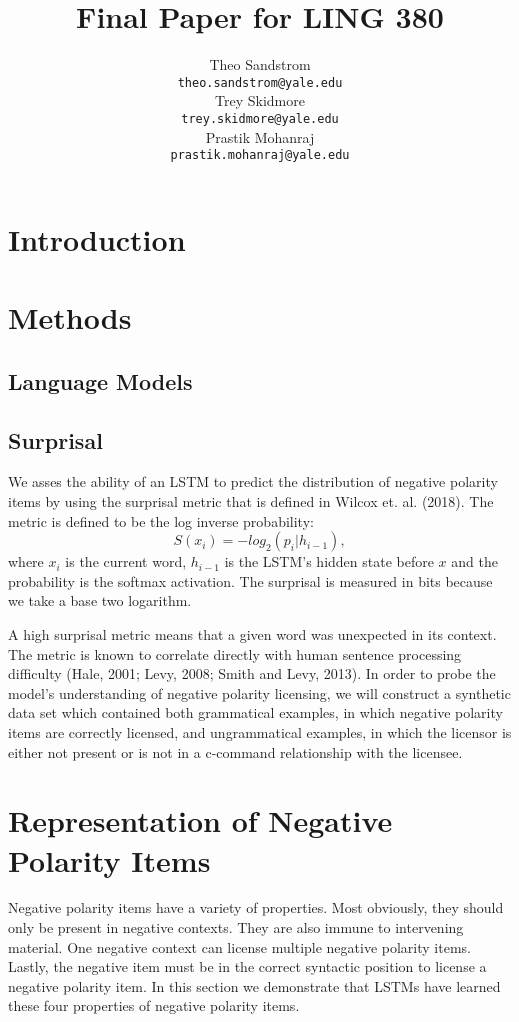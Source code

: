 \documentclass[11pt]{article}
\title{Final Paper for LING 380}
\author{Theo Sandstrom \\
  \texttt{theo.sandstrom@yale.edu} \\
  Trey Skidmore \\
  \texttt{trey.skidmore@yale.edu} \\
  Prastik Mohanraj \\
  \texttt{prastik.mohanraj@yale.edu}}
\begin{document}
\maketitle
\begin{abstract}

\end{abstract}

\section{Introduction}

\section{Methods}
\subsection{Language Models}
\subsection{Surprisal}
We asses the ability of an LSTM to predict the distribution of negative polarity items by using the surprisal metric that is defined in Wilcox et. al. (2018). The metric is defined to be the log inverse probability:
\[S(x_i) = -log_2(p_i|h_{i-1}),\]
where $x_i$ is the current word, $h_{i-1}$ is the LSTM's hidden state before $x$ and the probability is the softmax activation. The surprisal is measured in bits because we take a base two logarithm.

A high surprisal metric means that a given word was unexpected in its context. The metric is known to correlate directly with human sentence processing difficulty (Hale, 2001; Levy, 2008; Smith and Levy, 2013). In order to probe the model’s understanding of negative polarity licensing, we will construct a synthetic data set which contained both grammatical examples, in which negative polarity items are correctly licensed, and ungrammatical examples, in which the licensor is either not present or is not in a c-command relationship with the licensee.


\section{Representation of Negative Polarity Items}
Negative polarity items have a variety of properties. Most obviously, they should only be present in negative contexts. They are also immune to intervening material. One negative context can license multiple negative polarity items. Lastly, the negative item must be in the correct syntactic position to license a negative polarity item. In this section we demonstrate that LSTMs have learned these four properties of negative polarity items.
\end{document}
